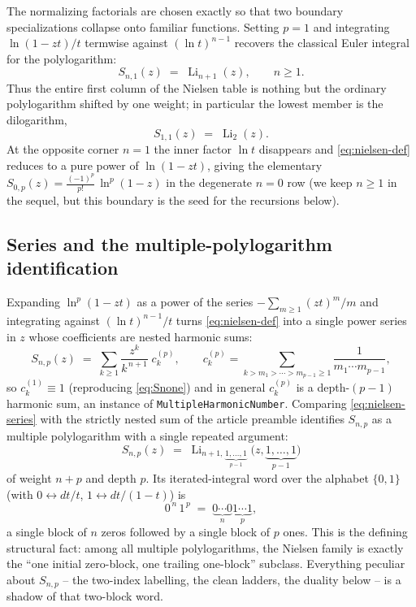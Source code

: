 \documentclass[11pt]{article}
\DeclareMathOperator{\Li}{Li}
\theoremstyle{plain}
\theoremstyle{remark}
\begin{document}
The normalizing factorials are chosen exactly so that two boundary specializations collapse onto familiar functions. Setting $p=1$ and integrating $\ln(1-zt)/t$ termwise against $(\ln t)^{n-1}$ recovers the classical Euler integral for the polylogarithm:
\begin{equation}\label{eq:Snone}
  S_{n,1}(z)\;=\;\Li_{n+1}(z),\qquad n\ge1 .
\end{equation}
Thus the entire first column of the Nielsen table is nothing but the ordinary polylogarithm shifted by one weight; in particular the lowest member is the dilogarithm,
\begin{equation}\label{eq:S11}
  S_{1,1}(z)\;=\;\Li_2(z).
\end{equation}
At the opposite corner $n=1$ the inner factor $\ln t$ disappears and \eqref{eq:nielsen-def} reduces to a pure power of $\ln(1-zt)$, giving the elementary
$
  S_{0,p}(z) = \tfrac{(-1)^p}{p!}\,\ln^{p}(1-z)
$
in the degenerate $n=0$ row (we keep $n\ge1$ in the sequel, but this boundary is the seed for the recursions below).

\subsection{Series and the multiple-polylogarithm identification}

Expanding $\ln^{p}(1-zt)$ as a power of the series $-\sum_{m\ge1}(zt)^m/m$ and integrating against $(\ln t)^{n-1}/t$ turns \eqref{eq:nielsen-def} into a single power series in $z$ whose coefficients are nested harmonic sums:
\begin{equation}\label{eq:nielsen-series}
  S_{n,p}(z)\;=\;\sum_{k\ge1}\frac{z^{k}}{k^{\,n+1}}\;c^{(p)}_{k},
  \qquad
  c^{(p)}_{k}=\sum_{k> m_1>\cdots> m_{p-1}\ge1}\frac{1}{m_1\cdots m_{p-1}} ,
\end{equation}
so $c^{(1)}_k\equiv1$ (reproducing \eqref{eq:Snone}) and in general $c^{(p)}_k$ is a depth-$(p-1)$ harmonic sum, an instance of \texttt{MultipleHarmonicNumber}. Comparing \eqref{eq:nielsen-series} with the strictly nested sum of the article preamble identifies $S_{n,p}$ as a multiple polylogarithm with a single repeated argument:
\begin{equation}\label{eq:nielsen-MPL}
  \boxed{\;S_{n,p}(z)\;=\;\Li_{n+1,\,\underbrace{\scriptstyle 1,\dots,1}_{p-1}}\!\bigl(z,\underbrace{1,\dots,1}_{p-1}\bigr)\;}
\end{equation}
of weight $n+p$ and depth $p$. Its iterated-integral word over the alphabet $\{0,1\}$ (with $0\leftrightarrow dt/t$, $1\leftrightarrow dt/(1-t)$) is
\[
  0^{\,n}\,1^{\,p}\;=\;\underbrace{0\cdots0}_{n}\underbrace{1\cdots1}_{p},
\]
a single block of $n$ zeros followed by a single block of $p$ ones. This is the defining structural fact: among all multiple polylogarithms, the Nielsen family is exactly the ``one initial zero-block, one trailing one-block'' subclass. Everything peculiar about $S_{n,p}$ -- the two-index labelling, the clean ladders, the duality below -- is a shadow of that two-block word.
\end{document}
